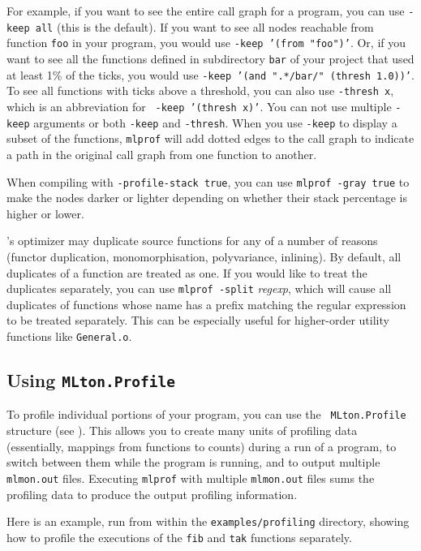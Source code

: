 For example, if you want to see the entire call graph for a program,
you can use {\tt -keep all} (this is the default).  If you want to see
all nodes reachable from function {\tt foo} in your program, you would
use {\tt -keep '(from "foo")'}.  Or, if you want to see all the
functions defined in subdirectory {\tt bar} of your project that used
at least 1\% of the ticks, you would use {\tt -keep '(and ".*/bar/"
(thresh 1.0))'}.  To see all functions with ticks above a threshold,
you can also use {\tt -thresh x}, which is an abbreviation for {\tt
-keep '(thresh x)'}.  You can not use multiple {\tt -keep} arguments
or both {\tt -keep} and {\tt -thresh}.  When you use {\tt -keep} to
display a subset of the functions, {\tt mlprof} will add dotted edges
to the call graph to indicate a path in the original call graph from
one function to another.

When compiling with {\tt -profile-stack true}, you can use {\tt mlprof
-gray true} to make the nodes darker or lighter depending on whether
their stack percentage is higher or lower.

{\mlton}'s optimizer may duplicate source functions for any of a
number of reasons (functor duplication, monomorphisation,
polyvariance, inlining).  By default, all duplicates of a function are
treated as one.  If you would like to treat the duplicates separately,
you can use {\tt mlprof -split} {\it regexp}, which will cause all
duplicates of functions whose name has a prefix matching the regular
expression to be treated separately.  This can be especially useful
for higher-order utility functions like {\tt General.o}.

\subsection{Using {\tt MLton.Profile}}

To profile individual portions of your program, you can use the {\tt
MLton.Profile} structure (see ).  This
allows you to create many units of profiling data (essentially,
mappings from functions to counts) during a run of a program, to
switch between them while the program is running, and to output
multiple {\tt mlmon.out} files.  Executing {\tt mlprof} with multiple
{\tt mlmon.out} files sums the profiling data to produce the output
profiling information.

Here is an example, run from within the {\tt examples/profiling}
directory, showing how to profile the executions of the {\tt fib} and
{\tt tak} functions separately.

